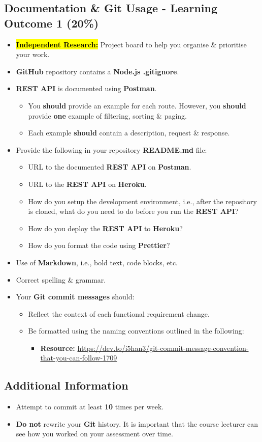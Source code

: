 \documentclass{article}
\begin{document}
\subsection*{Documentation \& Git Usage - Learning Outcome 1 (20\%)}
\begin{itemize}
	\item \hl{\textbf{Independent Research:}} Project board to help you organise \& prioritise your work. 
	\item \textbf{GitHub} repository contains a \textbf{Node.js .gitignore}.
	\item \textbf{REST API} is documented using \textbf{Postman}.
	\begin{itemize}
		\item You \textbf{should} provide an example for each route. However, you \textbf{should} provide \textbf{one} example of filtering, sorting \& paging. 
		\item Each example \textbf{should} contain a description, request \& response.
	\end{itemize}
	\item Provide the following in your repository \textbf{README.md} file:
	\begin{itemize}
		\item URL to the documented \textbf{REST API} on \textbf{Postman}.
		\item URL to the \textbf{REST API} on \textbf{Heroku}.
		\item How do you setup the development environment, i.e., after the repository is cloned, what do you need to do before you run the \textbf{REST API}?
		\item How do you deploy the \textbf{REST API} to \textbf{Heroku}?
		\item How do you format the code using \textbf{Prettier}?
	\end{itemize}
	\item Use of \textbf{Markdown}, i.e., bold text, code blocks, etc.
	\item Correct spelling \& grammar. 
	\item Your \textbf{Git commit messages} should:
	\begin{itemize}
		\item Reflect the context of each functional requirement change.
		\item Be formatted using the naming conventions outlined in the following:
			\begin{itemize}
				\item \textbf{Resource:} \small\href{https://dev.to/i5han3/git-commit-message-convention-that-you-can-follow-1709}{https://dev.to/i5han3/git-commit-message-convention-that-you-can-follow-1709}
			\end{itemize}
	\end{itemize}
\end{itemize}

\subsection*{Additional Information}
\begin{itemize}
    \item Attempt to commit at least \textbf{10} times per week.
    \item \textbf{Do not} rewrite your \textbf{Git} history. It is important that the course lecturer can see how you worked on your assessment over time. 
\end{itemize} 
\end{document}
